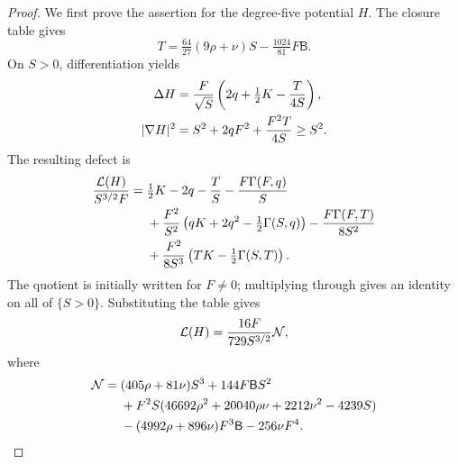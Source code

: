 \begin{proof}
We first prove the assertion for the degree-five potential \(H\).
The closure table gives
\begin{equation}\label{eq:nonradial-T}
 T=\tfrac{64}{27}(9\rho+\nu)S-\tfrac{1024}{81}F\mathsf{B}.
\end{equation}
On \(S>0\), differentiation yields
\begin{align}\label{eq:nonradial-H-derivatives}
 \Delta H&=\frac{F}{\sqrt S}
                  \left(2q+\tfrac12K-\frac{T}{4S}\right),\notag\\
 |\nabla H|^2&=S^2+2qF^2+\frac{F^2T}{4S}\ge S^2.
\end{align}
The resulting defect is
\begin{align}\label{eq:nonradial-intermediate}
 \frac{\mathcal L(H)}{S^{3/2}F}
 ={}&\tfrac12K-2q-\frac TS-\frac{F\Gamma(F,q)}S\notag\\
 &+\frac{F^2}{S^2}
       \left(qK+2q^2-\tfrac12\Gamma(S,q)\right)
       -\frac{F\Gamma(F,T)}{8S^2}\notag\\
 &+\frac{F^2}{8S^3}
                    \left(TK-\tfrac12\Gamma(S,T)\right).
\end{align}
The quotient is initially written for \(F\ne0\); multiplying
through gives an identity on all of \(\{S>0\}\).
Substituting the table gives
\begin{equation}\label{eq:nonradial-certificate}
 \mathcal L(H)=\frac{16F}{729S^{3/2}}\mathcal N,
\end{equation}
where
\begin{align}\label{eq:nonradial-N}
 \mathcal N={}&(405\rho+81\nu)S^3+144F\mathsf{B}S^2\notag\\
 &+F^2S(46692\rho^2+20040\rho\nu+2212\nu^2-4239S)\notag\\
 &-(4992\rho+896\nu)F^3\mathsf{B}-256\nu F^4.
\end{align}


\end{proof}
